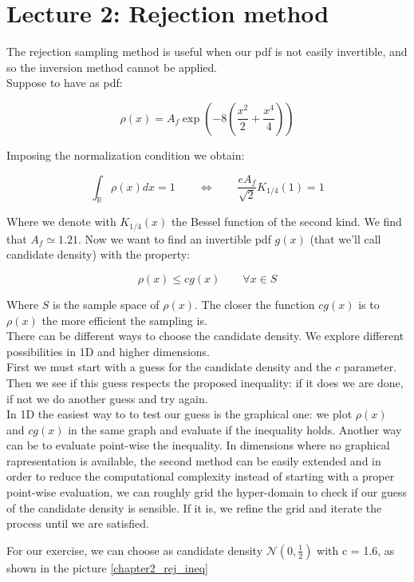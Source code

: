 \chapter*{Lecture 2: Rejection method}

The rejection sampling method is useful when our pdf is not easily invertible, and so the inversion method cannot be applied. \\
Suppose to have as pdf:

$$ \rho(x) = A_f \exp\left( -8 \left( \frac{x^2}{2}+\frac{x^4}{4} \right) \right) $$

Imposing the normalization condition we obtain:

$$ \int_{\mathbb{R}} \rho(x) dx = 1 \qquad \iff \qquad   \frac{eA_f}{\sqrt{2}}K_{1/4}(1) = 1$$

Where we denote with $K_{1/4}(x)$ the Bessel function of the second kind. 
We find that $A_f \simeq 1.21$.
Now we want to find an invertible pdf $g(x)$ (that we'll call candidate density) with the property:

$$ \rho(x) \leq c g(x) \qquad \forall x \in S $$

Where $S$ is the sample space of $\rho(x)$.
The closer the function $cg(x)$ is to $\rho(x)$ the more efficient the sampling is. \\

There can be different ways to choose the candidate density. We explore different possibilities in 1D and higher dimensions. \\
First we must start with a guess for the candidate density and the $c$ parameter. Then we see if this guess respects the proposed inequality: if it does we are done, if not we do another guess and try again. \\ 
In 1D the easiest way to to test our guess is the graphical one: we plot $\rho(x)$ and $cg(x)$ in the same graph and evaluate if the inequality holds. Another way can be to evaluate point-wise the inequality.
In dimensions where no graphical rapresentation is available, the second method can be easily extended and in order to reduce the computational complexity instead of starting with a proper point-wise evaluation, we can roughly grid the hyper-domain to check if our guess of the candidate density is sensible. If it is, we refine the grid and iterate the process until we are satisfied.

For our exercise, we can choose as candidate density $\mathcal{N}(0,\frac{1}{2})$ with c = 1.6, as shown in the picture \ref{chapter2_rej_ineq} \\

